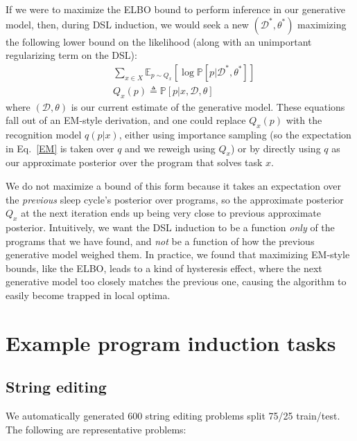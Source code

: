 \documentclass{article}
\newcommand{\expect}{\mathds{E}} %
\newcommand{\probability}{\mathds{P}} %
\begin{document}
If we were to maximize the ELBO bound to perform inference in
our generative model,
then, during DSL induction, we would seek a new $(\mathcal{D}^*,\theta^*)$ maximizing the following lower bound on the likelihood (along with an unimportant regularizing term on the DSL):
\begin{align}
  &  \sum_{x\in X}\expect_{p\sim Q_x}\left[\log \probability[p|\mathcal{D}^*,\theta^*] \right] \label{EM}\\
  & Q_x(p)\triangleq \probability[p|x,\mathcal{D},\theta]
\end{align}
where $(\mathcal{D},\theta)$ is our current estimate of the generative
model.  These equations fall out of an EM-style derivation, and one
could replace $Q_x(p)$ with the recognition model $q(p|x)$, either
using importance sampling (so the expectation in Eq.~\ref{EM} is taken
over $q$ and we reweigh using $Q_x$) or by directly using $q$ as our approximate posterior over the program that solves task $x$.

We do not maximize a bound of this form because it
takes an expectation over the \emph{previous} sleep cycle's
posterior over programs,
so the approximate posterior $Q_x$ at the next iteration
ends up being very close to previous approximate posterior.
Intuitively,
we want the DSL induction to be a function \emph{only} of the programs that we have found,
and \emph{not} be a function of how the previous generative model weighed them.
In practice,
we found that maximizing EM-style bounds, like the ELBO,
leads to a kind of hysteresis effect,
where the next generative model too closely matches the previous one,
causing the algorithm to easily become trapped in local optima.

\section{Example program induction tasks}

\subsection{String editing}

We automatically generated 600 string editing problems split 75/25 train/test.
The following are representative problems:

\vfill
\end{document}
